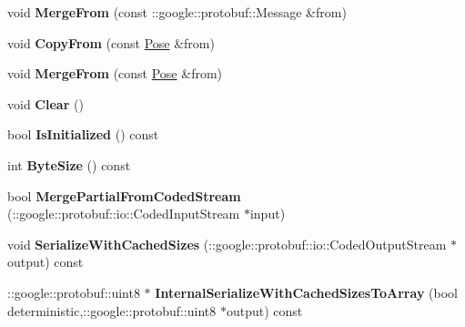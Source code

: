 \begin{DoxyCompactItemize}
\item 
void {\bfseries Merge\+From} (const \+::google\+::protobuf\+::\+Message \&from)\hypertarget{classvss__state_1_1Pose_aa1e7e92d17b26dce271b698e86145d2b}{}\label{classvss__state_1_1Pose_aa1e7e92d17b26dce271b698e86145d2b}

\item 
void {\bfseries Copy\+From} (const \hyperlink{classvss__state_1_1Pose}{Pose} \&from)\hypertarget{classvss__state_1_1Pose_a29467f35bd2186cb7e781eea648a8c3b}{}\label{classvss__state_1_1Pose_a29467f35bd2186cb7e781eea648a8c3b}

\item 
void {\bfseries Merge\+From} (const \hyperlink{classvss__state_1_1Pose}{Pose} \&from)\hypertarget{classvss__state_1_1Pose_a679b672f248c7a53c203465eb3dca328}{}\label{classvss__state_1_1Pose_a679b672f248c7a53c203465eb3dca328}

\item 
void {\bfseries Clear} ()\hypertarget{classvss__state_1_1Pose_a57b811afbc5889b23ad1713684619132}{}\label{classvss__state_1_1Pose_a57b811afbc5889b23ad1713684619132}

\item 
bool {\bfseries Is\+Initialized} () const \hypertarget{classvss__state_1_1Pose_a06a7663fb631cbc15bbdccb88d42d835}{}\label{classvss__state_1_1Pose_a06a7663fb631cbc15bbdccb88d42d835}

\item 
int {\bfseries Byte\+Size} () const \hypertarget{classvss__state_1_1Pose_a96e59891029ae382fd88854eea96b223}{}\label{classvss__state_1_1Pose_a96e59891029ae382fd88854eea96b223}

\item 
bool {\bfseries Merge\+Partial\+From\+Coded\+Stream} (\+::google\+::protobuf\+::io\+::\+Coded\+Input\+Stream $\ast$input)\hypertarget{classvss__state_1_1Pose_aad871e3c8d77d794b785e512d60e440c}{}\label{classvss__state_1_1Pose_aad871e3c8d77d794b785e512d60e440c}

\item 
void {\bfseries Serialize\+With\+Cached\+Sizes} (\+::google\+::protobuf\+::io\+::\+Coded\+Output\+Stream $\ast$output) const \hypertarget{classvss__state_1_1Pose_af1e240831f2cb26edfc3d2f9bc4583d4}{}\label{classvss__state_1_1Pose_af1e240831f2cb26edfc3d2f9bc4583d4}

\item 
\+::google\+::protobuf\+::uint8 $\ast$ {\bfseries Internal\+Serialize\+With\+Cached\+Sizes\+To\+Array} (bool deterministic,\+::google\+::protobuf\+::uint8 $\ast$output) const \hypertarget{classvss__state_1_1Pose_acc3af009b98896daefdfd7d78166b1ed}{}\label{classvss__state_1_1Pose_acc3af009b98896daefdfd7d78166b1ed}


\end{DoxyCompactItemize}
